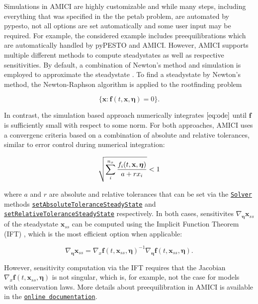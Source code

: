 \documentclass[11pt]{article}
\begin{document}
    Simulations in AMICI are highly customizable and while many steps,
including everything that was specified in the the petab problem, are
automated by pypesto, not all options are set automatically and some
user input may be required. For example, the considered example includes
preequilibrations which are automatically handled by pyPESTO and AMICI.
However, AMICI supports multiple different methods to compute
steadystates as well as respective sensitivities. By default, a
combination of Newton's method and simulation is employed to approximate
the steadystate \cite{2754712/LVNQBT95}. To find a steadystate by
Newton's method, the Newton-Raphson algorithm is applied to the
rootfinding problem

\[ \{\textbf{x}: \textbf{f}(t,\textbf{x},\boldsymbol{\eta}) = 0\}. \]

In contrast, the simulation based approach numerically integrates
\(\eqref{eq:ode}\) until \(\textbf{f}\) is sufficiently small with
respect to some norm. For both approaches, AMICI uses a convergenc
criteria based on a combination of absolute and relative tolerances,
similar to error control during numerical integration:

\[ \sqrt{\sum_i^{{n_{x}}} \frac{f_i(t,\textbf{x},\boldsymbol{\eta})}{a + r x_i}} < 1\]

where \(a\) and \(r\) are absolute and relative tolerances that can be
set via the
\href{https://amici.readthedocs.io/en/latest/generated/amici.amici.Solver.html\#amici.amici.Solver}{\texttt{Solver}}
methods
\href{https://amici.readthedocs.io/en/latest/generated/amici.amici.Solver.html\#amici.amici.Solver.setAbsoluteToleranceSteadyState}{\texttt{setAbsoluteToleranceSteadyState}}
and
\href{https://amici.readthedocs.io/en/latest/generated/amici.amici.Solver.html\#amici.amici.Solver.setRelativeToleranceSteadyState}{\texttt{setRelativeToleranceSteadyState}}
respectively. In both cases, sensitivites
\(\nabla_{\boldsymbol{\eta}}\textbf{x}_{ss}\) of the steadystate
\(\textbf{x}_{ss}\) can be computed using the Implicit Function Theorem
(IFT) \cite{2754712/6AWGLSM9}, which is the most efficient option when
applicable:

\[ \nabla_{\boldsymbol{\eta}}\textbf{x}_{ss} = \nabla_x\textbf{f}(t,\textbf{x}_{ss},\boldsymbol{\eta})^{-1}\nabla_{\boldsymbol{\eta}}\textbf{f}(t,\textbf{x}_{ss},\boldsymbol{\eta}) . \]

However, sensitivity computation via the IFT requires that the Jacobian
\(\nabla_x\textbf{f}(t,\textbf{x}_{ss},\boldsymbol{\eta})\) is not
singular, which is, for example, not the case for models with
conservation laws. More details about preequilibration in AMICI is
available in the
\href{https://amici.readthedocs.io/en/latest/ExampleEquilibrationLogic.html}{\texttt{online\ documentation}}.
\end{document}
